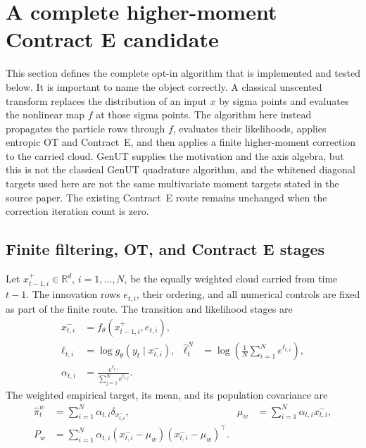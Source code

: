\FloatBarrier

\section{A complete higher-moment Contract E candidate}
\label{sec:bf-eot-higher-moment-contract-e}

This section defines the complete opt-in algorithm that is implemented and
tested below.  It is important to name the object correctly.  A classical
unscented transform replaces the distribution of an input \(x\) by sigma
points and evaluates the nonlinear map \(f\) at those sigma points.  The
algorithm here instead propagates the particle rows through \(f\), evaluates
their likelihoods, applies entropic OT and Contract~E, and then applies a
finite higher-moment correction to the carried cloud.  GenUT supplies the motivation and the axis algebra, but this is not the
classical GenUT quadrature algorithm, and the whitened diagonal targets used
here are not the same multivariate moment targets stated in the source paper.  The existing Contract~E route remains
unchanged when the correction iteration count is zero.

\subsection{Finite filtering, OT, and Contract E stages}

Let \(x_{t-1,i}^{+}\in\mathbb R^d\), \(i=1,\ldots,N\), be the equally
weighted cloud carried from time \(t-1\).  The innovation rows \(e_{t,i}\),
their ordering, and all numerical controls are fixed as part of the finite
route.  The transition and likelihood stages are
\begin{align}
 x_{t,i}^{-}&=f_\theta(x_{t-1,i}^{+},e_{t,i}),
 \label{eq:bf-eot-hm-transition}\\
 \ell_{t,i}&=\log g_\theta(y_t\mid x_{t,i}^{-}),
 &\widehat\ell_t^N&=\log\!\left(\frac1N\sum_{i=1}^N
 e^{\ell_{t,i}}\right),
 \label{eq:bf-eot-hm-likelihood}\\
 \alpha_{t,i}&=
 \frac{e^{\ell_{t,i}}}{\sum_{j=1}^N e^{\ell_{t,j}}}.
 \label{eq:bf-eot-hm-weights}
\end{align}
The weighted empirical target, its mean, and its population covariance are
\begin{align}
 \widehat\pi_t^w&=\sum_{i=1}^N\alpha_{t,i}\delta_{x_{t,i}^{-}},
 &\mu_w&=\sum_{i=1}^N\alpha_{t,i}x_{t,i}^{-},\\
 P_w&=\sum_{i=1}^N\alpha_{t,i}
 (x_{t,i}^{-}-\mu_w)(x_{t,i}^{-}-\mu_w)^\top.
 \label{eq:bf-eot-hm-weighted-moments}
\end{align}

